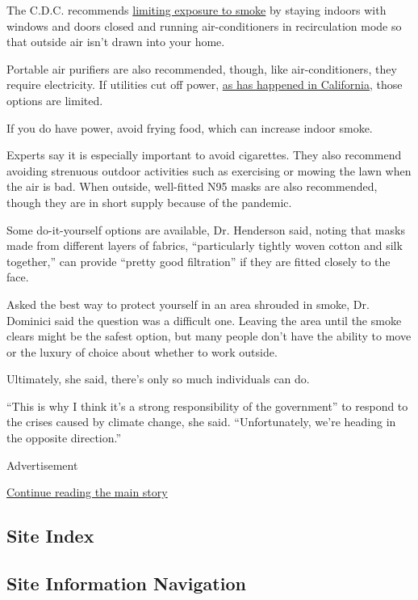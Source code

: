 The C.D.C. recommends
\href{https://www3.epa.gov/airnow/smoke_fires/prepare-for-fire-season-508.pdf}{limiting
exposure to smoke} by staying indoors with windows and doors closed and
running air-conditioners in recirculation mode so that outside air isn't
drawn into your home.

Portable air purifiers are also recommended, though, like
air-conditioners, they require electricity. If utilities cut off power,
\href{https://www.nytimes3xbfgragh.onion/2020/08/18/us/california-blackouts.html}{as
has happened in California}, those options are limited.

If you do have power, avoid frying food, which can increase indoor
smoke.

Experts say it is especially important to avoid cigarettes. They also
recommend avoiding strenuous outdoor activities such as exercising or
mowing the lawn when the air is bad. When outside, well-fitted N95 masks
are also recommended, though they are in short supply because of the
pandemic.

Some do-it-yourself options are available, Dr. Henderson said, noting
that masks made from different layers of fabrics, ``particularly tightly
woven cotton and silk together,'' can provide ``pretty good filtration''
if they are fitted closely to the face.

Asked the best way to protect yourself in an area shrouded in smoke, Dr.
Dominici said the question was a difficult one. Leaving the area until
the smoke clears might be the safest option, but many people don't have
the ability to move or the luxury of choice about whether to work
outside.

Ultimately, she said, there's only so much individuals can do.

``This is why I think it's a strong responsibility of the government''
to respond to the crises caused by climate change, she said.
``Unfortunately, we're heading in the opposite direction.''

Advertisement

\protect\hyperlink{after-bottom}{Continue reading the main story}

\hypertarget{site-index}{%
\subsection{Site Index}\label{site-index}}

\hypertarget{site-information-navigation}{%
\subsection{Site Information
Navigation}\label{site-information-navigation}}

